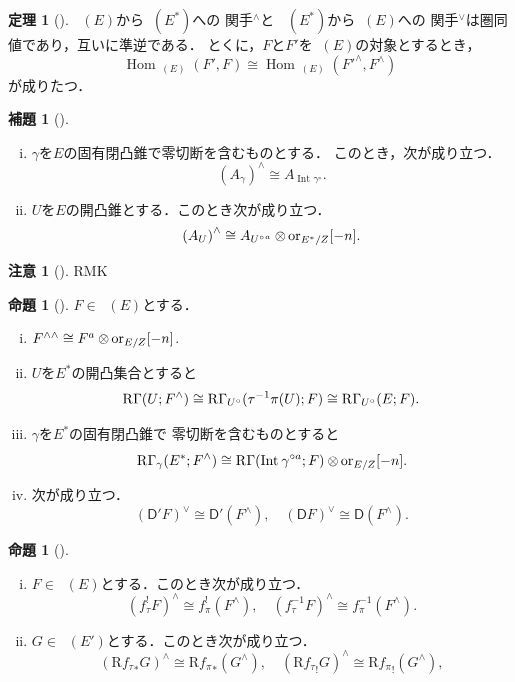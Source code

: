 \documentclass[leqno, 10pt, a4paper, dvipdfmx]{jsarticle}
\theoremstyle{definition}
\newcommand{\rr}{\mathbf{R}}
\newcommand{\Hom}{\mathop{\mathrm{Hom}}\nolimits} %
\numberwithin{equation}{section}
\newcommand{\RG}{\mathop{\mathrm{R}\hspace{-0pt}\Gamma}\nolimits}
\newcommand{\Rder}{\mathrm{R}}
\newcommand{\rmD}{\mathsf{D}}
\newcommand{\ori}{\mathord{\mathrm{or}}}
\newcommand{\tens}[1][]{\mathbin{\otimes_{\raise1.5ex\hbox to-.1em{}{#1}}}}
\theoremstyle{mystyle}
\newtheorem{THM}[AXM]{定理}
\newtheorem{PRP}[AXM]{命題}
\newtheorem{LMM}[AXM]{補題}
\newtheorem{RMK}[AXM]{注意}
\newcommand{\Int}[1][]{\mathop{\mathrm{Int}}\nolimits_{#1}}
\newcommand{\Dlcon}{\mathop{\mathsf{D}^{+}_{\rr_{>0}}}\nolimits}
\begin{document}
\begin{THM}[{\cite[Theorem 3.7.9]{KS90}}]
    \(\Dlcon(E)\)から\(\Dlcon(E^\ast)\)への
    関手\({}^{\wedge}\)と
    \(\Dlcon(E^\ast)\)から\(\Dlcon(E)\)への
    関手\({}^{\vee}\)は圏同値であり，互いに準逆である．
    とくに，\(F\)と\(F'\)を\(\Dlcon(E)\)の対象とするとき，
    \[
        \Hom_{\Dlcon(E)}(F',F)\cong
        \Hom_{\Dlcon(E)}(F'^{\wedge},F^{\wedge})
    \]
    が成りたつ．
\end{THM}
\begin{LMM}[{\cite[Lemma 3.7.10]{KS90}}]
    \begin{enumerate}[(i)]
        \item \(\gamma\)を\(E\)の固有閉凸錐で零切断を含むものとする．
        このとき，次が成り立つ．\[
            \left(A_\gamma\right)^\wedge
            \cong A_{\Int{\gamma^\circ}}.
        \]
        \item \(U\)を\(E\)の開凸錐とする．このとき次が成り立つ．
        \[
            \left(A_U\right)^\wedge\cong
            A_{{U^{\circ}}^a}\tens \ori_{E^\ast/Z}[-n].
        \]
    \end{enumerate}
\end{LMM}
\begin{RMK}[{\cite[Remark 3.7.11]{KS90}}]
    RMK
\end{RMK}
\begin{PRP}[{\cite[Proposition 3.7.12]{KS90}}]
    \(F\in\Dlcon(E)\)とする．
    \begin{enumerate}[(i)]
        \item \(F^{\wedge\wedge}\cong F^a\tens \ori_{E/Z}[-n]\).
        \item \(U\)を\(E^\ast\)の開凸集合とすると\[
            \RG(U;F^\wedge)
            \cong\RG_{U^\circ}(\tau^{-1}\pi(U);F)
            \cong\RG_{U^\circ}(E;F).
        \]
        \item \(\gamma\)を\(E^\ast\)の固有閉凸錐で
        零切断を含むものとすると\[
            \RG_{\gamma}(E^\ast;F^\wedge)
            \cong
            \RG(\Int{\gamma^{\circ a}};F)\tens\ori_{E/Z}[-n].
        \]
        \item 次が成り立つ．\[
            \left(\rmD'F\right)^\vee\cong\rmD'(F^\wedge),
            \quad
            \left(\rmD F\right)^\vee\cong\rmD(F^\wedge).
            \]
    \end{enumerate}
\end{PRP}
\begin{PRP}[{\cite[Proposition 3.7.13]{KS90}}]
    \begin{enumerate}[(i)]
        \item \(F\in\Dlcon(E)\)とする．このとき次が成り立つ．\[
            (f_\tau^!F)^\wedge\cong f_\pi^!(F^\wedge),
            \quad
            (f_\tau^{-1}F)^\wedge\cong f_\pi^{-1}(F^\wedge).
            \]
        \item \(G\in\Dlcon(E')\)とする．このとき次が成り立つ．\[
            (\Rder{f_\tau}_\ast G)^\wedge\cong \Rder{f_\pi}_\ast(G^\wedge),
            \quad
            (\Rder{f_\tau}_! G)^\wedge\cong \Rder{f_\pi}_!(G^\wedge),
            \]
    \end{enumerate}
\end{PRP}
\end{document}
